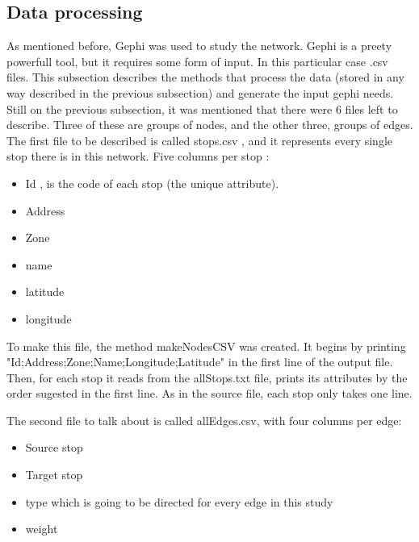 \documentclass[12pt]{report}
\begin{document}
\subsection{Data processing}
	
	As mentioned before, Gephi was used to study the network. Gephi is a preety powerfull tool, but it requires some form of input. In this particular case .csv files. This subsection describes the methods that process the data (stored in any way described in the previous subsection) and generate the input gephi needs.\\
	Still on the previous subsection, it was mentioned that there were 6 files left to describe. Three of these are groups of nodes, and the other three, groups of edges. \\
	
	The first file to be described is called stops.csv , and it represents every single stop there is in this network. Five columns per stop :
	
	\begin{itemize}
		\item Id , is the code of each stop (the unique attribute).
		\item Address
		\item Zone
		\item name
		\item latitude
		\item longitude
	\end{itemize}
	
	To make this file, the method makeNodesCSV was created.
	It begins by printing "Id;Address;Zone;Name;Longitude;Latitude" in the first line of the output file. Then, for each stop it reads from the allStops.txt file, prints its attributes by the order sugested in the first line. As in the source file, each stop only takes one line.
	
	The second file to talk about is called allEdges.csv, with four columns per edge:
	
	\begin{itemize}
		\item Source stop
		\item Target stop
		\item type which is going to be directed for every edge in this study
		\item weight 
	\end{itemize}
	
\end{document}
